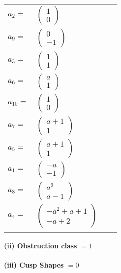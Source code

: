 \documentclass[1p]{elsarticle_modified}
\theoremstyle{definition}
\begin{document}
\begin{tabular}{m{7pt} m{180pt} m{7pt} m{180pt} }
\flushright $a_{2}=$&$\begin{pmatrix}1\\0\end{pmatrix}$ \\
\flushright $a_{9}=$&$\begin{pmatrix}0\\-1\end{pmatrix}$ \\
\flushright $a_{3}=$&$\begin{pmatrix}1\\1\end{pmatrix}$ \\
\flushright $a_{6}=$&$\begin{pmatrix}a\\1\end{pmatrix}$ \\
\flushright $a_{10}=$&$\begin{pmatrix}1\\0\end{pmatrix}$ \\
\flushright $a_{7}=$&$\begin{pmatrix}a+1\\1\end{pmatrix}$ \\
\flushright $a_{5}=$&$\begin{pmatrix}a+1\\1\end{pmatrix}$ \\
\flushright $a_{1}=$&$\begin{pmatrix}- a\\-1\end{pmatrix}$ \\
\flushright $a_{8}=$&$\begin{pmatrix}a^2\\a-1\end{pmatrix}$ \\
\flushright $a_{4}=$&$\begin{pmatrix}- a^2+a+1\\- a+2\end{pmatrix}$\\&\end{tabular}
\flushleft \textbf{(ii) Obstruction class $= 1$}\\~\\
\flushleft \textbf{(iii) Cusp Shapes $= 0$}\\~\\
\end{document}
